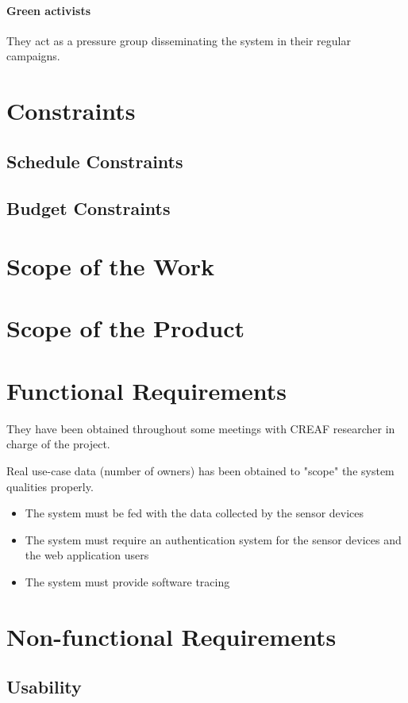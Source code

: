 \paragraph{Green activists} They act as a pressure group disseminating the system in their regular campaigns.

\section{Constraints}
\subsection{Schedule Constraints}
\subsection{Budget Constraints}

\section{Scope of the Work}
\section{Scope of the Product}

\section{Functional Requirements}

They have been obtained throughout some meetings with CREAF researcher in charge of the project.

Real use-case data (number of owners) has been obtained to "scope" the system qualities properly.

\begin{itemize}
	\item The system must be fed with the data collected by the sensor devices
	\item The system must require an authentication system for the sensor devices and the web application users
	\item The system must provide software tracing
\end{itemize}

\section{Non-functional Requirements}

\subsection*{Usability}

